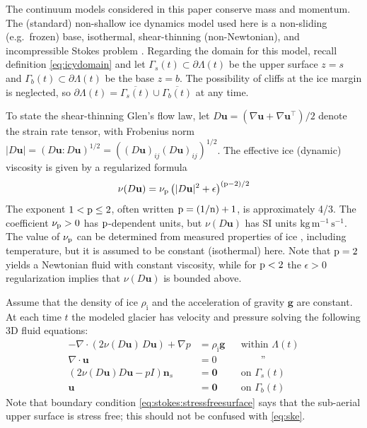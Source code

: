 \documentclass[hidelinks,onefignum,onetabnum,final]{siamart220329}  %
\newcommand{\eps}{\epsilon}
\newcommand{\grad}{\nabla}
\newcommand{\bg}{\mathbf{g}}
\newcommand{\bn}{\mathbf{n}}
\newcommand{\bu}{\mathbf{u}}
\newcommand{\bzero}{\bm{0}}
\newcommand{\nn}{{\text{\textnormal{n}}}}
\newcommand{\pp}{{\text{\textnormal{p}}}}
\newcommand{\rhoi}{\rho_{\text{i}}}
\begin{document}
The continuum models considered in this paper conserve mass and momentum.   The (standard) non-shallow ice dynamics model used here is a non-sliding (e.g.~frozen) base, isothermal, shear-thinning (non-Newtonian), and incompressible Stokes problem \cite{GreveBlatter2009,JouvetRappaz2011,SchoofHewitt2013}.  Regarding the domain for this model, recall definition \eqref{eq:icydomain} and let $\Gamma_s(t) \subset \partial \Lambda(t)$ be the upper surface $z=s$ and $\Gamma_b(t) \subset \partial \Lambda(t)$ be the base $z=b$.  The possibility of cliffs at the ice margin is neglected, so $\partial \Lambda(t) = \overline{\Gamma_s(t)} \cup \overline{\Gamma_b(t)}$ at any time.

To state the shear-thinning Glen's flow law, let $D\bu=(\grad \bu + \grad \bu^{\top})/2$ denote the strain rate tensor, with Frobenius norm $|D\bu| = (D\bu:D\bu)^{1/2} = \left((D\bu)_{ij} (D\bu)_{ij}\right)^{1/2}$.  The effective ice (dynamic) viscosity \cite{GreveBlatter2009} is given by a regularized formula
\begin{equation}
\nu(D\bu) = \nu_\pp \left(|D\bu|^2 + \eps\right)^{(\pp-2)/2} \label{eq:glen}
\end{equation}
The exponent $1 < \pp \le 2$, often written $\pp=(1/\nn)+1$, is approximately 4/3.  The coefficient $\nu_\pp>0$ has $\pp$-dependent units, but $\nu(D\bu)$ has SI units $\text{kg}\,\text{m}^{-1}\,\text{s}^{-1}$.  The value of $\nu_\pp$ can be determined from measured properties of ice \cite{GoldsbyKohlstedt2001,GreveBlatter2009}, including temperature, but it is assumed to be constant (isothermal) here.  Note that $\pp=2$ yields a Newtonian fluid with constant viscosity, while for $\pp < 2$ the $\eps>0$ regularization implies that $\nu(D\bu)$ is bounded above.

Assume that the density of ice $\rhoi$ and the acceleration of gravity $\bg$ are constant.  At each time $t$ the modeled glacier has velocity and pressure solving the following 3D fluid equations:
\begin{subequations}
\label{eq:stokes}
\begin{align}
- \nabla \cdot \left(2 \nu(D\bu)\, D\bu\right) + \nabla p &= \rhoi \bg && \text{within $\Lambda(t)$} \\
\nabla \cdot \bu &= 0 && \qquad \text{''} \label{eq:stokes:incomp} \\
\left(2 \nu(D\bu) D\bu - pI\right) \bn_s &= \bzero && \text{on $\Gamma_s(t)$}\label{eq:stokes:stressfreesurface} \\
\bu  &= \bzero && \text{on $\Gamma_b(t)$}
\end{align}
\end{subequations}
Note that boundary condition \eqref{eq:stokes:stressfreesurface} says that the sub-aerial upper surface is stress free; this should not be confused with \eqref{eq:ske}.
\end{document}
